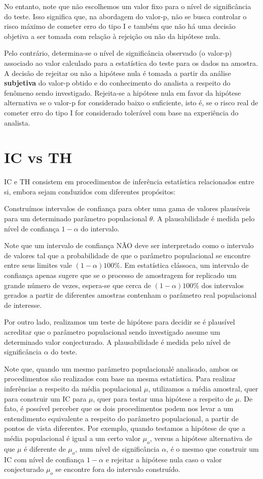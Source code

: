 \documentclass[
]{book}
\theoremstyle{definition}
\theoremstyle{definition}
\theoremstyle{definition}
\theoremstyle{remark}
\begin{document}
No entanto, note que não escolhemos um valor fixo para o nível de significância do teste. Isso significa que, na abordagem do valor-p, não se busca controlar o risco máximo de cometer erro do tipo I e também que não há uma decisão objetiva a ser tomada com relação à rejeição ou não da hipótese nula.

Pelo contrário, determina-se o nível de significância observado (o valor-p) associado ao valor calculado para a estatística do teste para os dados na amostra. A decisão de rejeitar ou não a hipótese nula é tomada a partir da análise \textbf{subjetiva} do valor-p obtido e do conhecimento do analista a respeito do fenômeno sendo investigado. Rejeita-se a hipótese nula em favor da hipótese alternativa se o valor-p for considerado baixo o suficiente, isto é, se o risco real de cometer erro do tipo I for considerado tolerável com base na experiência do analista.

\hypertarget{ic-vs-th}{%
\section{IC vs TH}\label{ic-vs-th}}

IC e TH consistem em procedimentos de inferência estatística relacionados entre si, embora sejam conduzidos com diferentes propósitos:

Construímos intervalos de confiança para obter uma gama de valores plausíveis para um determinado parâmetro populacional \(\theta\). A plausabilidade é medida pelo nível de confiança \(1-\alpha\) do intervalo.

Note que um intervalo de confiança NÃO deve ser interpretado como o intervalo de valores tal que a probabilidade de que o parâmetro populacional se encontre entre seus limites vale \((1-\alpha)100\%\). Em estatística clássoca, um intervalo de confiança apenas sugere que se o processo de amostragem for replicado um grande número de vezes, espera-se que cerca de \((1-\alpha)100\%\) dos intervalos gerados a partir de diferentes amostras contenham o parâmetro real populacional de interesse.

Por outro lado, realizamos um teste de hipótese para decidir se é plausível acreditar que o parâmetro populacional sendo investigado assume um determinado valor conjecturado. A plausabilidade é medida pelo nível de significância \(\alpha\) do teste.

Note que, quando um mesmo parâmetro populacionalé analisado, ambos os procedimentos são realizados com base na mesma estatística. Para realizar inferências a respeito da média populacional \(\mu\), utilizamos a média amostral, quer para construir um IC para \(\mu\), quer para testar uma hipótese a respeito de \(\mu\). De fato, é possível perceber que os dois procedimentos podem nos levar a um entendimento equivalente a respeito do parâmetro populacional, a partir de pontos de vista diferentes. Por exemplo, quando testamos a hipótese de que a média populacional é igual a um certo valor \(\mu_o\), versus a hipótese alternativa de que \(\mu\) é diferente de \(\mu_o\), num nível de significância \(\alpha\), é o mesmo que construir um IC com nível de confiança \(1-\alpha\) e rejeitar a hipótese nula caso o valor conjecturado \(\mu_o\) se encontre fora do intervalo construído.

  
\end{document}
